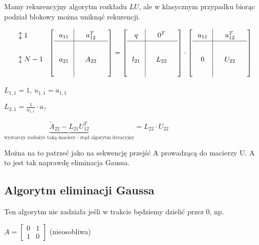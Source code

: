\documentclass[hidelinks,a4paper,fleqn]{article}
\begin{document}
Mamy rekurencyjny algorytm rozkładu $LU$, ale w klasycznym przypadku biorąc podział blokowy można uniknąć rekurencji.

\[\arraycolsep=0.7em\def\arraystretch{1.4}
	\begin{array}{l}
		\updownarrow 1   \\ \\
		\updownarrow N-1 \\ \ 
	\end{array}
	\left[
		\begin{array}{c|c}
			a_{11} & \quad a_{12}^T \quad \\ \hline & \\
			a_{21} & A_{22}               \\ &
		\end{array}
	\right] =
	\left[
		\begin{array}{c|c}
			q      & \quad 0^T \quad \\ \hline & \\
			l_{21} & L_{22}          \\ &
		\end{array}
	\right]
	\cdot 
	\left[
		\begin{array}{c|c}
			u_{11} & \quad u_{12}^T \quad \\ \hline & \\
			0      & U_{22}               \\ &
		\end{array}
	\right]
\]

$L_{1,1} = 1$, $u_{1,1} = a_{1,1}$

$L_{2,1} = \frac{1}{a_{1,1}} \cdot a_{?}$

$\underbrace{\tilde{A}_{22} - L_{21}U_{12}^T}_{\textrm{wystarczy rozłożyć taką macierz - stąd algorytm iteracyjny}} = L_{22} \cdot U_{22}$


Można na to patrzeć jako na sekwencję przejść A prowadzącą do macierzy U. A to jest tak naprawdę eliminacja Gaussa.

\subsection{Algorytm eliminacji Gaussa}

Ten algorytm nie zadziała jeśli w trakcie będziemy dzielić przez 0, np.

$A = \left[
	\begin{array}{cc}
		0 & 1 \\
		1 & 0 
\end{array}\right]$ (nieosobliwa)
    
\end{document}
